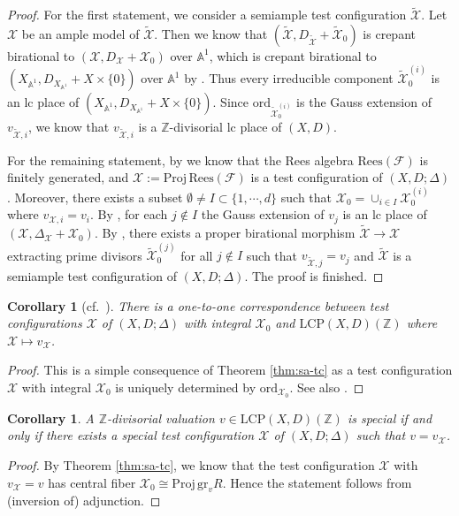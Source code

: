 \documentclass[reqno, 12pt]{amsart}
\newtheorem{cor}[prop]{Corollary}
\theoremstyle{definition}
\newcommand{\bA}{\mathbb{A}}
\newcommand{\bZ}{\mathbb{Z}}
\newcommand{\cX}{\mathcal{X}}
\newcommand{\cF}{\mathcal{F}}
\newcommand{\ord}{\mathrm{ord}}
\newcommand{\gr}{\mathrm{gr}}
\newcommand{\tcX}{\widetilde{\mathcal{X}}}
\newcommand{\Proj}{\mathrm{Proj}}
\newcommand{\LCP}{\mathrm{LCP}}
\newcommand{\Rees}{\mathrm{Rees}}
\numberwithin{equation}{section}
\begin{document}
\begin{proof}
For the first statement, we consider a semiample test configuration $\tcX$. Let $\cX$ be an ample model of $\tcX$. Then we know that $(\tcX, D_{\tcX}+\tcX_0)$ is crepant birational to $(\cX, D_{\cX}+\cX_0)$  over $\bA^1$, which is crepant birational to $(X_{\bA^1}, D_{X_{\bA^1}} + X\times \{0\})$ over $\bA^1$ by \cite[Lemma 2.10(1)]{BABWILD}. Thus every irreducible component $\tcX_0^{(i)}$ is an lc place of $(X_{\bA^1}, D_{X_{\bA^1}} + X\times \{0\})$. Since $\ord_{\tcX_0^{(i)}}$ is the Gauss extension of $v_{\tcX,i}$, we know that $v_{\tcX,i}$ is a $\bZ$-divisorial lc place of $(X,D)$. 

For the remaining statement, by \cite[Proposition 4.9]{BABWILD} we know that the Rees algebra $\Rees(\cF)$ is finitely generated, and $\cX:=\Proj\, \Rees(\cF)$ is a test configuration of $(X,D;\Delta)$. Moreover, there exists a subset $\emptyset\neq I\subset \{1,\cdots, d\}$ such that $\cX_0 = \cup_{i\in I} \cX_0^{(i)}$ where $v_{\cX, i} = v_i$. By  \cite[Last paragraph of Proof of Proposition A.5]{BLX22}, for each $j\not\in I$ the Gauss extension of $v_{j}$ is an lc place of $(\cX, \Delta_{\cX}+ \cX_0)$. By \cite{BCHM10}, there exists a proper birational morphism $\tcX\to \cX$ extracting prime divisors $\tcX_0^{(j)}$ for all $j \not\in I$ such that $v_{\tcX, j}= v_j$ and $\tcX$ is a semiample test configuration of $(X,D;\Delta)$. The proof is finished.
\end{proof}

\begin{cor}[cf.\ \cite{CZ22, BABWILD}]
There is a one-to-one correspondence between test configurations $\cX$ of $(X,D;\Delta)$ with integral $\cX_0$ and $\LCP(X,D)(\bZ)$ where $\cX\mapsto v_{\cX}$. 
\end{cor}

\begin{proof}
This is a simple consequence of Theorem \ref{thm:sa-tc} as a test configuration $\cX$ with integral $\cX_0$ is uniquely determined by $\ord_{\cX_0}$. See also \cite[Theorem 4.8]{BABWILD}.
\end{proof}

\begin{cor}
A $\bZ$-divisorial valuation $v\in \LCP(X,D)(\bZ)$ is special if and only if there exists a special test configuration $\cX$ of $(X,D;\Delta)$ such that $v = v_{\cX}$. 
\end{cor}

\begin{proof}
By Theorem \ref{thm:sa-tc}, we know that the test configuration $\cX$ with $v_{\cX} = v$ has central fiber $\cX_0 \cong \Proj \, \gr_v R$. Hence the statement follows from (inversion of) adjunction.
\end{proof}
\end{document}
